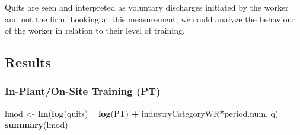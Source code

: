 \documentclass[
]{article}
\newenvironment{Shaded}{\begin{snugshade}}{\end{snugshade}}
\newcommand{\KeywordTok}[1]{\textcolor[rgb]{0.13,0.29,0.53}{\textbf{#1}}}
\newcommand{\NormalTok}[1]{#1}
\newcommand{\OperatorTok}[1]{\textcolor[rgb]{0.81,0.36,0.00}{\textbf{#1}}}
\newcommand{\StringTok}[1]{\textcolor[rgb]{0.31,0.60,0.02}{#1}}
\begin{document}
Quits are seen and interpreted as voluntary discharges initiated by the
worker and not the firm. Looking at this measurement, we could analyze
the behaviour of the worker in relation to their level of training.

\hypertarget{results-2}{%
\subsection{Results}\label{results-2}}

\hypertarget{in-planton-site-training-pt-2}{%
\subsubsection{In-Plant/On-Site Training
(PT)}\label{in-planton-site-training-pt-2}}

\begin{Shaded}
\begin{Highlighting}[]
\NormalTok{lmod <-}\StringTok{ }\KeywordTok{lm}\NormalTok{(}\KeywordTok{log}\NormalTok{(quits) }\OperatorTok{~}\StringTok{ }\KeywordTok{log}\NormalTok{(PT) }\OperatorTok{+}\StringTok{ }\NormalTok{industryCategoryWR}\OperatorTok{*}\NormalTok{period.num, q)}
\KeywordTok{summary}\NormalTok{(lmod)}
\end{Highlighting}
\end{Shaded}
\end{document}
